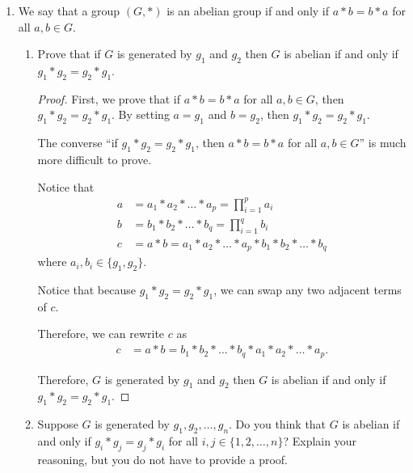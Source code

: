 \documentclass{article}
\begin{document}
\begin{enumerate}
{\begin{enumerate}
        \end{enumerate}
    }

    \item {
        We say that a group \((G,*)\) is an abelian group if and only if 
        \(a * b = b * a\) for all \(a, b \in G\).
      
        \begin{enumerate}
            \item {
                Prove that if \(G\) is generated by \(g_1\) and \(g_2\) then 
                \(G\) is abelian if and only if \(g_1 * g_2 = g_2 * g_1\).


                \begin{proof}
                    First, we prove that if \(a * b = b * a\) for all \(a, b \in G\),
                    then \(g_1 * g_2 = g_2 * g_1\). By setting \(a = g_1\) and 
                    \(b = g_2\),  then \(g_1 * g_2 = g_2 * g_1\).

                    The converse ``if \(g_1 * g_2 = g_2 * g_1\), then \(a * b = b * a\) for all \(a, b \in G\)''
                    is much more difficult to prove. 

                    Notice that 
                    \begin{align}
                        a &= a_1 * a_2 * \dots * a_p = \prod_{i=1}^p a_i \\
                        b &= b_1 * b_2 * \dots * b_q = \prod_{i=1}^q b_i \\
                        c &= a * b = a_1 * a_2 * \dots * a_p * b_1 * b_2 * \dots * b_q
                    \end{align}
                    where \(a_i, b_i \in \{g_1, g_2\}\).

                    Notice that because \(g_1 * g_2 = g_2 * g_1\), we can swap 
                    any two adjacent terms of \(c\).

                    Therefore, we can rewrite \(c\) as 
                    \begin{align}
                        c &= a * b = b_1 * b_2 * \dots * b_q * a_1 * a_2 * \dots * a_p.
                    \end{align}

                    Therefore, \(G\) is generated by \(g_1\) and \(g_2\) then 
                    \(G\) is abelian if and only if \(g_1 * g_2 = g_2 * g_1\).
                \end{proof}
            }
        
            \item {
                Suppose \(G\) is generated by \(g_1, g_2, \dots, g_n\). Do you 
                think that \(G\) is abelian if and only if \(g_i * g_j = g_j * g_i\) 
                for all \(i, j \in \{1, 2, \dots, n\}\)? Explain your reasoning, 
                but you do not have to provide a proof.

}
\end{enumerate}}
\end{enumerate}
\end{document}
